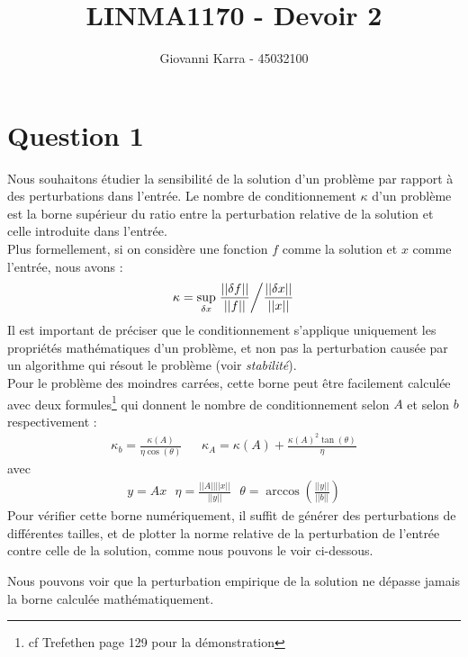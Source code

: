 \documentclass[11pt]{article}
\title{LINMA1170 - Devoir 2}
\author{Giovanni Karra - 45032100}
\begin{document}
\maketitle

\section*{Question 1}
Nous souhaitons étudier la sensibilité de la solution d'un problème par rapport à des perturbations dans l'entrée. Le nombre de conditionnement $\kappa$ d'un problème est la borne supérieur du ratio entre la perturbation relative de la solution et celle introduite dans l'entrée. \\
Plus formellement, si on considère une fonction $f$ comme la solution et $x$ comme l'entrée, nous avons :
\begin{align}
    \kappa = \sup_{\delta x}\left. \frac{||\delta f||}{||f||} \middle/ \frac{||\delta x||}{||x||} \right.
\end{align}
Il est important de préciser que le conditionnement s'applique uniquement les propriétés mathématiques d'un problème, et non pas la perturbation causée par un algorithme qui résout le problème (voir \textit{stabilité}).\\
Pour le problème des moindres carrées, cette borne peut être facilement calculée avec deux formules\footnote{cf Trefethen page 129 pour la démonstration} qui donnent le nombre de conditionnement selon $A$ et selon $b$ respectivement :
\begin{align}
    \kappa_b = \frac{\kappa(A)}{\eta \cos(\theta)}~~~~~~~\kappa_A = \kappa(A) + \frac{\kappa(A)^2\tan(\theta)}{\eta}
\end{align}
avec
\begin{align}
    y = Ax ~~~ \eta = \frac{||A||||x||}{||y||} ~~~
    \theta = \arccos\left(\frac{||y||}{||b||}\right)
\end{align}
Pour vérifier cette borne numériquement, il suffit de générer des perturbations de différentes tailles, et de plotter la norme relative de la perturbation de l'entrée contre celle de la solution, comme nous pouvons le voir ci-dessous.
\begin{figure}[H]
    \centering
    
    
    
    
\end{figure}
Nous pouvons voir que la perturbation empirique de la solution ne dépasse jamais la borne calculée mathématiquement.
\end{document}
